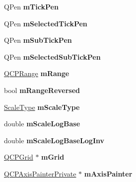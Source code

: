 \begin{DoxyCompactItemize}
\item 
\hypertarget{classQCPAxis_a1d52c78c856d8bd1f331d4ec4e63d944}{\-Q\-Pen {\bfseries m\-Tick\-Pen}}\label{classQCPAxis_a1d52c78c856d8bd1f331d4ec4e63d944}

\item 
\hypertarget{classQCPAxis_a9524593dbc75a5c5b29dbd1cb4b37df5}{\-Q\-Pen {\bfseries m\-Selected\-Tick\-Pen}}\label{classQCPAxis_a9524593dbc75a5c5b29dbd1cb4b37df5}

\item 
\hypertarget{classQCPAxis_a32ef56d3a417866720eb12667d27dbd1}{\-Q\-Pen {\bfseries m\-Sub\-Tick\-Pen}}\label{classQCPAxis_a32ef56d3a417866720eb12667d27dbd1}

\item 
\hypertarget{classQCPAxis_aa5cc6afc5dc2a365f5abbd36eb04a1dc}{\-Q\-Pen {\bfseries m\-Selected\-Sub\-Tick\-Pen}}\label{classQCPAxis_aa5cc6afc5dc2a365f5abbd36eb04a1dc}

\item 
\hypertarget{classQCPAxis_a1ee36773c49062d751560e11f90845f7}{\hyperlink{classQCPRange}{\-Q\-C\-P\-Range} {\bfseries m\-Range}}\label{classQCPAxis_a1ee36773c49062d751560e11f90845f7}

\item 
\hypertarget{classQCPAxis_a5cb034f57aa3d773a9ca55a0931dbf7b}{bool {\bfseries m\-Range\-Reversed}}\label{classQCPAxis_a5cb034f57aa3d773a9ca55a0931dbf7b}

\item 
\hypertarget{classQCPAxis_ad706039549cbbbec5fcb2baf7894e04d}{\hyperlink{classQCPAxis_a36d8e8658dbaa179bf2aeb973db2d6f0}{\-Scale\-Type} {\bfseries m\-Scale\-Type}}\label{classQCPAxis_ad706039549cbbbec5fcb2baf7894e04d}

\item 
\hypertarget{classQCPAxis_abc727ddb4af745151755d1b5e60d03c3}{double {\bfseries m\-Scale\-Log\-Base}}\label{classQCPAxis_abc727ddb4af745151755d1b5e60d03c3}

\item 
\hypertarget{classQCPAxis_a93e068984b475467929e7f6768754227}{double {\bfseries m\-Scale\-Log\-Base\-Log\-Inv}}\label{classQCPAxis_a93e068984b475467929e7f6768754227}

\item 
\hypertarget{classQCPAxis_a17bffb94aaa40311f259c6ac7bcb5d5f}{\hyperlink{classQCPGrid}{\-Q\-C\-P\-Grid} $\ast$ {\bfseries m\-Grid}}\label{classQCPAxis_a17bffb94aaa40311f259c6ac7bcb5d5f}

\item 
\hypertarget{classQCPAxis_aeeae00935bd2dab82d64f32544a90913}{\hyperlink{classQCPAxisPainterPrivate}{\-Q\-C\-P\-Axis\-Painter\-Private} $\ast$ {\bfseries m\-Axis\-Painter}}\label{classQCPAxis_aeeae00935bd2dab82d64f32544a90913}


\end{DoxyCompactItemize}
